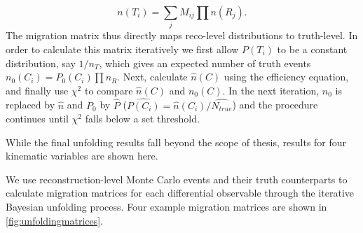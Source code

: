 \begin{equation}
n(T_i)=\sum_j M_{ij} \prod n(R_j).
\end{equation}
The migration matrix thus directly maps reco-level distributions to truth-level. In order to calculate this matrix iteratively we first allow $P(T_i)$ to be a constant distribution, say $1/n_T$, which gives an expected number of truth events $n_0(C_i)=P_0(C_i)\prod n_R$. Next, calculate $\hat{n}(C)$ using the efficiency equation, and finally use $\chi^2$ to compare $\hat{n}(C)$ and $n_0(C)$. In the next iteration, $n_0$ is replaced by $\hat{n}$ and $P_0$ by $\hat{P}$ ($\hat{P(C_i)}=\hat{n}(C_i)/\hat{N_{true}}$) and the procedure continues until $\chi^2$ falls below a set threshold. 

While the final unfolding results fall beyond the scope of thesis, results for four kinematic variables are shown here. 


We use reconstruction-level Monte Carlo events and their truth counterparts to calculate migration matrices for each differential observable through the iterative Bayesian unfolding process. Four example migration matrices are shown in \ref{fig:unfoldingmatrices}. 

